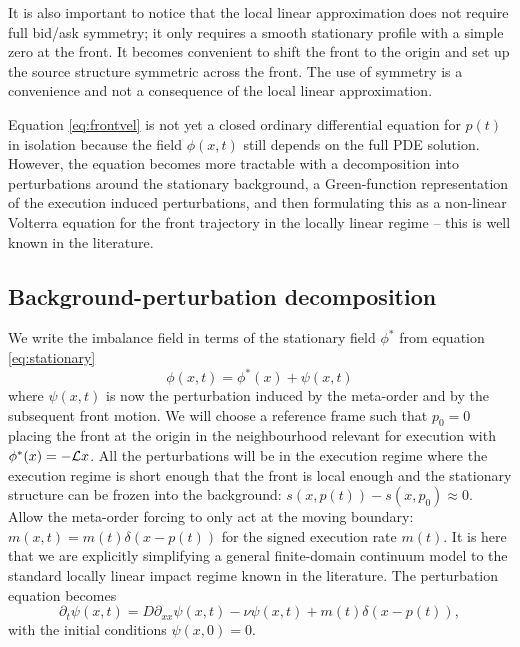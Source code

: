 \documentclass[5p,final]{elsarticle}
\begin{document}
It is also important to notice that the local linear approximation does not require full bid/ask symmetry; it only requires a smooth stationary profile with a simple zero at the front. It becomes convenient to shift the front to the origin and set up the source structure symmetric across the front. The use of symmetry is a convenience and not a consequence of the local linear approximation. 

Equation \ref{eq:frontvel} is not yet a closed ordinary differential equation for $p(t)$ in isolation because the field $\phi(x,t)$ still depends on the full PDE solution. However, the equation becomes more tractable with a decomposition into perturbations around the stationary background, a Green-function representation of the execution induced perturbations, and then formulating this as a non-linear Volterra equation for the front trajectory in the locally linear regime -- this is well known in the literature. 

\subsection{Background-perturbation decomposition} \label{ssec:background}

We write the imbalance field in terms of the stationary field $\phi^*$ from equation \ref{eq:stationary}
\begin{equation}
    \phi(x,t) = \phi^*(x) + \psi(x,t)
\end{equation}
where $\psi(x,t)$ is now the perturbation induced by the meta-order and by the subsequent front motion. We will choose a reference frame such that $p_0=0$ placing the front at the origin in the neighbourhood relevant for execution with $\phi^*(x) = - {\cal L}x$. All the perturbations will be in the execution regime where the execution regime is short enough that the front is local enough and the stationary structure can be frozen into the background: $s(x,p(t))-s(x,p_0) \approx 0$. Allow the meta-order forcing to only act at the moving boundary: $m(x,t) = m(t) \delta(x-p(t))$ for the signed execution rate $m(t)$. It is here that we are explicitly simplifying a general finite-domain continuum model to the standard locally linear impact regime known in the literature. The perturbation equation becomes
\begin{equation}
    \partial_t \psi(x,t) = D \partial_{xx} \psi(x,t) - \nu \psi (x,t) + m(t) \delta (x- p(t)), \label{eq:perturbation}
\end{equation}
with the initial conditions $\psi(x,0)=0$.
\end{document}
